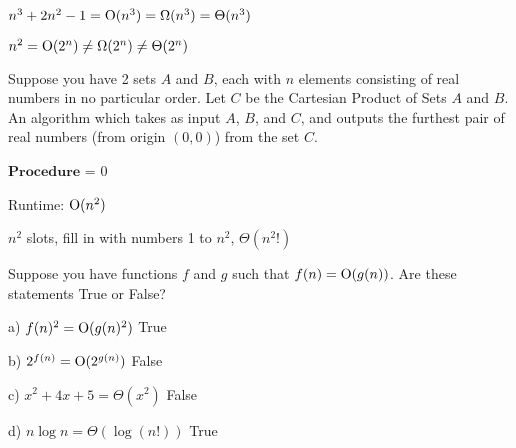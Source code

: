 \begin{ex}
$n^3 + 2n^2 - 1 = {\rm O}(n^3) = \Omega(n^3) = \Theta(n^3)$
\end{ex}

\begin{ex}
$n^2 = {\rm O}(2^n) \neq \Omega(2^n) \neq \Theta(2^n)$
\end{ex}

\begin{prob}
Suppose you have 2 sets $A$ and $B$, each with $n$ elements consisting of real numbers in no particular order. Let $C$ be the Cartesian Product of Sets $A$ and $B$. An algorithm which takes as input $A$, $B$, and $C$, and outputs the furthest pair of real numbers (from origin $(0, 0)$) from the set $C$.




\begin{algorithm}[Algorithm]
\SetAlgoLined
\DontPrintSemicolon
{}
$\mathbf{Procedure}$ \FurthestPair{\A$[1...\n]$, \B$[1...\n]$, \C$[1...\n^2][1...2]$}\;
\Max = 0\;
\Return \FurthestPair\;
\end{algorithm}


Runtime: ${\rm O}(n^2)$
\end{prob}

\begin{prob}

$n^2$ slots, fill in with numbers 1 to $n^2$, $\Theta(n^2 !)$

\end{prob}

\begin{prob}

Suppose you have functions $f$ and $g$ such that $f(n) = {\rm O}(g(n))$. Are these statements True or False?

a) $f(n)^2 = {\rm O}(g(n)^2)$ True

b) $2^{f(n)} = {\rm O}(2^{g(n)})$ False

c) $x^2 + 4x + 5 = \Theta(x^2)$ False

d) $n \log n = \Theta(\log(n!))$ True

\end{prob}

